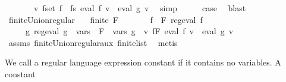 \begin{isabellebody}
\ \ \ \ \ \ {\isasymand}\ {\isacharparenleft}{\kern0pt}{\isasymforall}v{\isachardot}{\kern0pt}\ {\isacharparenleft}{\kern0pt}{\isasymUnion}f{\isasymin}set\ {\isacharparenleft}{\kern0pt}f{}\ {\isacharhash}{\kern0pt}\ fs{\isacharparenright}{\kern0pt}{\isachardot}{\kern0pt}\ eval\ f\ v{\isacharparenright}{\kern0pt}\ {\isacharequal}{\kern0pt}\ eval\ {\isacharquery}{\kern0pt}g{\isacharprime}{\kern0pt}\ v{\isacharparenright}{\kern0pt}{\isachardoublequoteclose}\ \isamarkupfalse%
\ simp\isanewline
\ \ \isamarkupfalse%
\ \isamarkupfalse%
\ {\isacharquery}{\kern0pt}case\ \isamarkupfalse%
\ blast\isanewline
{}\isamarkupfalse%
%
\endisatagproof
{\isafoldproof}%
%
\isadelimproof
\isanewline
%
\endisadelimproof
\isanewline
{}\isamarkupfalse%
\ finite{\isacharunderscore}{\kern0pt}Union{\isacharunderscore}{\kern0pt}regular{\isacharcolon}{\kern0pt}\isanewline
\ \ \ {\isachardoublequoteopen}finite\ F{\isachardoublequoteclose}\isanewline
\ \ \ \ \ \ \ {\isachardoublequoteopen}{\isasymforall}f\ {\isasymin}\ F{\isachardot}{\kern0pt}\ reg{\isacharunderscore}{\kern0pt}eval\ f{\isachardoublequoteclose}\isanewline
\ \ \ \ \ {\isachardoublequoteopen}{\isasymexists}g{\isachardot}{\kern0pt}\ reg{\isacharunderscore}{\kern0pt}eval\ g\ {\isasymand}\ {\isasymUnion}{\isacharparenleft}{\kern0pt}vars\ {\isacharbackquote}{\kern0pt}\ F{\isacharparenright}{\kern0pt}\ {\isacharequal}{\kern0pt}\ vars\ g\ {\isasymand}\ {\isacharparenleft}{\kern0pt}{\isasymforall}v{\isachardot}{\kern0pt}\ {\isacharparenleft}{\kern0pt}{\isasymUnion}f{\isasymin}F{\isachardot}{\kern0pt}\ eval\ f\ v{\isacharparenright}{\kern0pt}\ {\isacharequal}{\kern0pt}\ eval\ g\ v{\isacharparenright}{\kern0pt}{\isachardoublequoteclose}\isanewline
%
\isadelimproof
\ \ %
\endisadelimproof
%
\isatagproof
{}\isamarkupfalse%
\ assms\ finite{\isacharunderscore}{\kern0pt}Union{\isacharunderscore}{\kern0pt}regular{\isacharunderscore}{\kern0pt}aux\ finite{\isacharunderscore}{\kern0pt}list\ \isamarkupfalse%
\ metis%
\endisatagproof
{\isafoldproof}%
%
\isadelimproof
%
\endisadelimproof
%
\isadelimdocument
%
\endisadelimdocument
%
\isatagdocument
%
\isamarkuptrue%
%
\endisatagdocument
{\isafolddocument}%
%
\isadelimdocument
%
\endisadelimdocument
%
\begin{isamarkuptext}%
We call a regular language expression constant if it contains no variables. A constant

\end{isamarkuptext}
\end{isabellebody}
